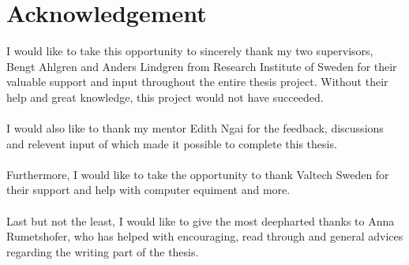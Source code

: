 \section*{Acknowledgement}

I would like to take this opportunity to sincerely thank my two supervisors, Bengt Ahlgren and Anders Lindgren from Research Institute of Sweden for their valuable support and input throughout the entire thesis project. Without their help and great knowledge, this project would not have succeeded.\\\\
I would also like to thank my mentor Edith Ngai for the feedback, discussions and relevent input of which made it possible to complete this thesis.\\\\
Furthermore, I would like to take the opportunity to thank Valtech Sweden for their support and help with computer equiment and more.\\\\
Last but not the least, I would like to give the most deepharted thanks to Anna Rumetshofer, who has helped with encouraging, read through and general advices regarding the writing part of the thesis.\\\\







